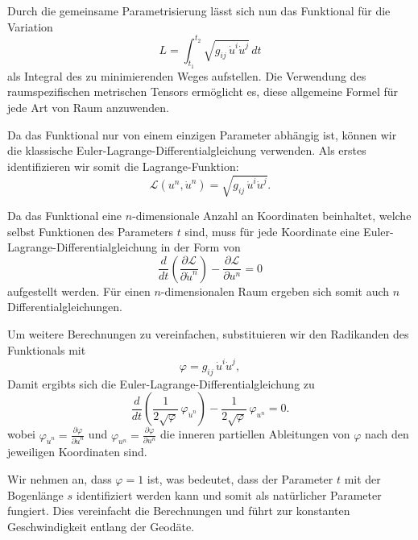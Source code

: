 Durch die gemeinsame Parametrisierung lässt sich nun das Funktional für die Variation 
\begin{equation}
	L = \int_{t_1}^{t_2} \sqrt{g_{ij} \, \dot{u}^i \dot{u}^j} \, dt
\end{equation}
als Integral des zu minimierenden Weges aufstellen.
Die Verwendung des raumspezifischen metrischen Tensors ermöglicht es, diese allgemeine Formel für jede Art von Raum anzuwenden.

Da das Funktional nur von einem einzigen Parameter abhängig ist, können wir die klassische Euler-Lagrange-Differentialgleichung verwenden.
Als erstes identifizieren wir somit die Lagrange-Funktion:
\begin{equation}
	\mathcal{L}(u^n, \dot{u}^n) = \sqrt{g_{ij} \, \dot{u}^i \dot{u}^j}.
\end{equation}

Da das Funktional eine $n$-dimensionale Anzahl an Koordinaten beinhaltet, welche selbst Funktionen des Parameters $t$ sind, muss für jede Koordinate eine Euler-Lagrange-Differentialgleichung in der Form von
\begin{equation}
	\frac{d}{dt} \left(\frac{\partial \mathcal{L}}{\partial \dot{u}^n}\right) - \frac{\partial \mathcal{L}}{\partial u^n} = 0
\end{equation}
aufgestellt werden. 
Für einen $n$-dimensionalen Raum ergeben sich somit auch $n$ Differentialgleichungen. 

Um weitere Berechnungen zu vereinfachen, substituieren wir den Radikanden des Funktionals mit
\begin{equation}
	\varphi = g_{ij} \, \dot{u}^i \dot{u}^j,
\end{equation}
Damit ergibts sich die Euler-Lagrange-Differentialgleichung zu
\begin{equation}
	\frac{d}{dt} \left(\frac{1}{2 \sqrt{\varphi}} \, \varphi_{\dot{u}^n}\right) - \frac{1}{2 \sqrt{\varphi}} \, \varphi_{u^n} = 0.
\end{equation}
wobei $\varphi_{\dot{u}^n} = \frac{\partial \varphi}{\partial \dot{u}^n}$ und $\varphi_{u^n} = \frac{\partial \varphi}{\partial u^n}$ die inneren partiellen Ableitungen von $\varphi$ nach den jeweiligen Koordinaten sind.

Wir nehmen an, dass $\varphi = 1$ ist, was bedeutet, dass der Parameter $t$ mit der Bogenlänge $s$ identifiziert werden kann und somit als natürlicher Parameter fungiert.
Dies vereinfacht die Berechnungen und führt zur konstanten Geschwindigkeit entlang der Geodäte.

